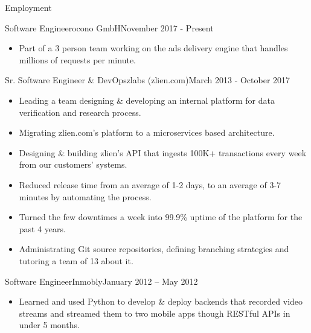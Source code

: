 \documentclass[]{mosabcv}
\begin{document}
	\makeheader
	
	
	\begin{cvsection}{Employment}
		\begin{cvsubsection}{Software Engineer}{ocono GmbH}{November 2017 - Present}
		\begin{itemize}
			\item Part of a 3 person team working on the ads delivery engine that handles millions of requests per minute.
		\end {itemize}

		\end{cvsubsection}
		\begin{cvsubsection}{Sr. Software Engineer \& DevOps}{zlabs (zlien.com)}{March 2013 - October 2017}
		\begin{itemize}
				\item Leading a team designing \& developing an internal platform for data verification and research process.
				\item Migrating zlien.com's platform to a microservices based architecture.
				\item Designing \& building zlien's API that ingests 100K+ transactions every week from our customers' systems.
				\item Reduced release time from an average of 1-2 days, to an average of 3-7 minutes by automating the process.
				\item Turned the few downtimes a week into 99.9\% uptime of the platform for the past 4 years.
				\item Administrating Git source repositories, defining branching strategies and tutoring a team of 13 about it.
			\end{itemize}
		\end{cvsubsection}
		
		\begin{cvsubsection}{Software Engineer}{Inmobly}{January 2012 – May 2012}		
			\begin{itemize}
				\item Learned and used Python to develop \& deploy backends that recorded video streams and streamed them to two mobile apps though RESTful APIs in under 5 months.
			\end{itemize}
		\end{cvsubsection}
		

\end{cvsection}
\end{document}
